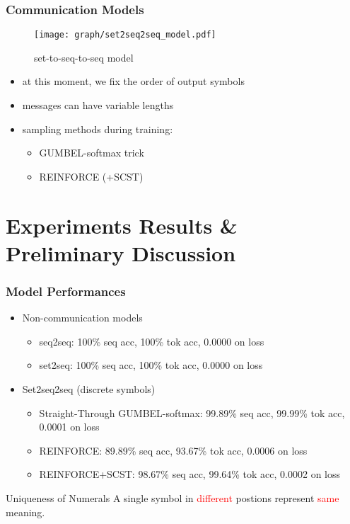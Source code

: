 \documentclass[compress,mathserif,xcolor=dvipsnames,svgnames,aspectratio=43]{beamer}
\begin{document}
\begin{frame}[c]
  \frametitle{Communication Models}
  \begin{figure}[!ht]
    \centering
    \texttt{[image: graph/set2seq2seq\_model.pdf]}
    \caption{set-to-seq-to-seq model}
    \label{fig:3set2seq2seq_model}
  \end{figure}
  \vspace{-0.25in}
  \begin{itemize}
    \item at this moment, we fix the order of output symbols
    \item messages can have variable lengths
    \item sampling methods during training: 
      \begin{itemize}
        \item GUMBEL-softmax trick
        \item REINFORCE (+SCST)
      \end{itemize}
  \end{itemize}
\end{frame}

\section{Experiments Results \& Preliminary Discussion}

\begin{frame}[c]
  \frametitle{Model Performances}
  \begin{itemize}
    \item Non-communication models
      \begin{itemize}
        \item seq2seq: 100\% seq acc, 100\% tok acc, 0.0000 on loss 
        \item set2seq: 100\% seq acc, 100\% tok acc, 0.0000 on loss
      \end{itemize}
    \item Set2seq2seq (discrete symbols)
      \begin{itemize}
        \item Straight-Through GUMBEL-softmax: 99.89\% seq acc, 99.99\% tok acc, 0.0001 on loss
        \item REINFORCE: 89.89\% seq acc, 93.67\% tok acc, 0.0006 on loss
        \item REINFORCE+SCST: 98.67\% seq acc, 99.64\% tok acc, 0.0002 on loss
      \end{itemize}
  \end{itemize}

  \begin{block}{Uniqueness of Numerals}
    A single symbol in \textcolor{red}{different} postions represent \textcolor{red}{same} meaning.
  \end{block}
\end{frame}
\end{document}
